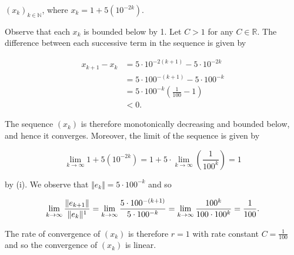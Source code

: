 $(x_k)_{k \in \mathbb{N}}$, where $x_k = 1 + 5 \left(10^{-2k}\right)$.

\begin{solution}
  Observe that each $x_k$ is bounded below by 1.
  Let $C > 1$ for any $C \in \mathbb{R}$. The difference between each successive term in the sequence is given by

  \begin{align*}
    x_{k+1} - x_{k} &= 5 \cdot 10^{-2(k+1)} - 5 \cdot 10^{-2k} \\
                    &= 5 \cdot 100^{-(k+1)} - 5 \cdot 100^{-k} \\
                    &= 5 \cdot 100^{-k} \left( \frac{1}{100} - 1 \right) \\
                    &< 0.
  \end{align*}

  The sequence $(x_k)$ is therefore monotonically decreasing and bounded below, and hence it converges. Moreover, the 
  limit of the sequence is given by

  $$
  \lim\limits_{k \to \infty} 1 + 5\left( 10^{-2k} \right)
      = 1 + 5 \cdot \lim\limits_{k \to \infty} \left( \frac{1}{100^k} \right)
      = 1
  $$

  by (i). We observe that $\Vert e_{k} \Vert = 5 \cdot 100^{-k}$ and so

  $$
    \lim\limits_{k \to \infty} \frac{\Vert e_{k+1} \Vert}{\Vert e_k \Vert^1} 
        = \lim\limits_{k \to \infty} \frac{5 \cdot 100^{-(k+1)}}{5 \cdot 100^{-k}} \\
        = \lim\limits_{k \to \infty} \frac{100^k}{100 \cdot 100^k} \\
        = \frac{1}{100}.
  $$

  The rate of convergence of $(x_k)$ is therefore $r = 1$ with rate constant $C = \frac{1}{100}$ and so the convergence
  of $(x_k)$ is linear.
  \ \\
\end{solution}